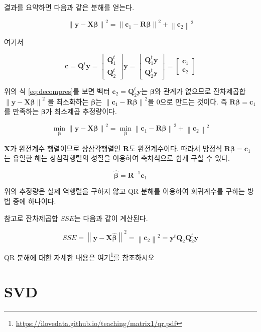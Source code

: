\documentclass[
]{book}
\makeatletter
\newcommand{\norm}[1]{\left\lVert#1\right\rVert}
\renewcommand{\href}[2]{#2\footnote{\url{#1}}}
\newenvironment{kframe}{%
\medskip{}
\setlength{\fboxsep}{.8em}
 \def\at@end@of@kframe{}%
 \ifinner\ifhmode%
  \def\at@end@of@kframe{\end{minipage}}%
  \begin{minipage}{\columnwidth}%
 \fi\fi%
 \def\FrameCommand##1{\hskip\@totalleftmargin \hskip-\fboxsep
 \colorbox{shadecolor}{##1}\hskip-\fboxsep
     \hskip-\linewidth \hskip-\@totalleftmargin \hskip\columnwidth}%
 \MakeFramed {\advance\hsize-\width
   \@totalleftmargin\z@ \linewidth\hsize
   \@setminipage}}%
 {\par\unskip\endMakeFramed%
 \at@end@of@kframe}
\newenvironment{rmdblock}[1]
  {
  \begin{itemize}
  \renewcommand{\labelitemi}{
    \raisebox{-.7\height}[0pt][0pt]{
      {\setkeys{Gin}{width=3em,keepaspectratio}\texttt{[image: images/\#1]}}
    }
  }
  \setlength{\fboxsep}{1em}
  \begin{kframe}
  \item
  }
  {
  \end{kframe}
  \end{itemize}
  }
\newenvironment{rmdnote}
  {\begin{rmdblock}{note}}
  {\end{rmdblock}}
\theoremstyle{definition}
\theoremstyle{definition}
\theoremstyle{definition}
\theoremstyle{definition}
\theoremstyle{remark}
\makeatother
\begin{document}
결과를 요약하면 다음과 같은 분해를 얻는다.

\begin{equation}
\norm{ \bm y-\bm X \bm \beta}^2 = \norm{ \bm c_1 - \bm R \bm \beta }^2 + \norm{\bm c_2}^2 
\label{eq:decompres}
\end{equation}

여기서

\[
\bm c= \bm Q^t \bm y=
 \begin{bmatrix} 
   \bm Q_1^t \\ 
   \bm Q_2^t 
   \end{bmatrix} \bm y 
   =
   \begin{bmatrix} 
   \bm Q_1^t \bm y  \\ 
   \bm Q_2^t \bm y 
   \end{bmatrix}
   = \begin{bmatrix} 
   \bm c_1 \\ 
   \bm c_2 
\end{bmatrix}  
\]

위의 식 \eqref{eq:decompres}를 보면 벡터 \(\bm c_2= \bm Q_2^t \bm y\)는 \(\bm \beta\)와 관계가 없으므로 잔차제곱합 \(\norm{ \bm y-\bm X \bm \beta}^2\) 을 최소화하는
\(\bm \beta\)는 \(\norm{ \bm c_1 - \bm R \bm \beta }^2\)을 0으로 만드는 것이다. 즉 \(\bm R \bm \beta =\bm c_1\)를 만족하는 \(\bm \beta\)가 최소제곱 추정량이다.

\[
\min_{\bm \beta} \norm{ \bm y-\bm X \bm \beta}^2 = \min_{\bm \beta} \norm{ \bm c_1 - \bm R \bm \beta }^2 +  \norm{\bm c_2}^2 
\]

\(\bm X\)가 완전계수 행렬이므로 상삼각행렬인 \(\bm R\)도 완전계수이다. 따라서 방정식 \(\bm R \bm \beta = \bm c_1\)는 유일한 해는 상삼각행렬의 성질을 이용하여 축차식으로 쉽게 구할 수 있다.

\[ \hat {\bm \beta} =\bm R^{-1} \bm c_1 \]

위의 추정량은 실제 역행렬을 구하지 않고 QR 분해를 이용하여 회귀계수를 구하는 방법 중에 하나이다.

참고로 잔차제곱합 \(SSE\)는 다음과 같이 계산된다.

\[ SSE = \norm{ \bm y-\bm X \hat {\bm \beta}}^2 = \norm{\bm c_2}^2 = \bm y^t \bm Q_2 \bm Q_2^t \bm y \]

\begin{rmdnote}
QR 분해에 대한 자세한 내용은 \href{https://ilovedata.github.io/teaching/matrix1/qr.pdf}{여기}를 참조하시오
\end{rmdnote}

\hypertarget{svd}{%
\section{SVD}\label{svd}}
\end{document}
